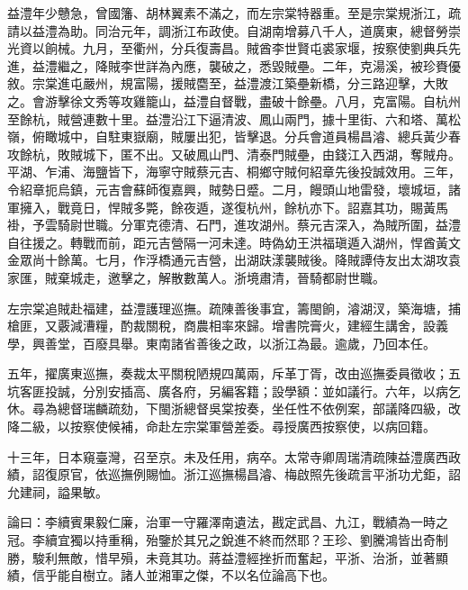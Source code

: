 \begin{pinyinscope}
益澧年少戇急，曾國籓、胡林翼素不滿之，而左宗棠特器重。至是宗棠規浙江，疏請以益澧為助。同治元年，調浙江布政使。自湖南增募八千人，道廣東，總督勞崇光資以餉械。九月，至衢州，分兵復壽昌。賊酋李世賢屯裘家堰，按察使劉典兵先進，益澧繼之，降賊李世詳為內應，襲破之，悉毀賊壘。二年，克湯溪，被珍賚優敘。宗棠進屯嚴州，規富陽，援賊麕至，益澧渡江築壘新橋，分三路迎擊，大敗之。會游擊徐文秀等攻雞籠山，益澧自督戰，盡破十餘壘。八月，克富陽。自杭州至餘杭，賊營連數十里。益澧沿江下逼清波、鳳山兩門，據十里街、六和塔、萬松嶺，俯瞰城中，自駐東嶽廟，賊屢出犯，皆擊退。分兵會道員楊昌濬、總兵黃少春攻餘杭，敗賊城下，匿不出。又破鳳山門、清泰門賊壘，由錢江入西湖，奪賊舟。平湖、乍浦、海鹽皆下，海寧守賊蔡元吉、桐鄉守賊何紹章先後投誠效用。三年，令紹章扼烏鎮，元吉會蘇師復嘉興，賊勢日蹙。二月，饅頭山地雷發，壞城垣，諸軍擁入，戰竟日，悍賊多斃，餘夜遁，遂復杭州，餘杭亦下。詔嘉其功，賜黃馬褂，予雲騎尉世職。分軍克德清、石門，進攻湖州。蔡元吉深入，為賊所圍，益澧自往援之。轉戰而前，距元吉營隔一河未達。時偽幼王洪福瑱遁入湖州，悍酋黃文金眾尚十餘萬。七月，作浮橋通元吉營，出湖趺漾襲賊後。降賊譚侍友出太湖攻袁家匯，賊棄城走，邀擊之，解散數萬人。浙境肅清，晉騎都尉世職。

左宗棠追賊赴福建，益澧護理巡撫。疏陳善後事宜，籌閩餉，濬湖汊，築海塘，捕槍匪，又覈減漕糧，酌裁關稅，商農相率來歸。增書院膏火，建經生講舍，設義學，興善堂，百廢具舉。東南諸省善後之政，以浙江為最。逾歲，乃回本任。

五年，擢廣東巡撫，奏裁太平關稅陋規四萬兩，斥革丁胥，改由巡撫委員徵收；五坑客匪投誠，分別安插高、廣各府，另編客籍；設學額：並如議行。六年，以病乞休。尋為總督瑞麟疏劾，下閩浙總督吳棠按奏，坐任性不依例案，部議降四級，改降二級，以按察使候補，命赴左宗棠軍營差委。尋授廣西按察使，以病回籍。

十三年，日本窺臺灣，召至京。未及任用，病卒。太常寺卿周瑞清疏陳益澧廣西政績，詔復原官，依巡撫例賜恤。浙江巡撫楊昌濬、梅啟照先後疏言平浙功尤鉅，詔允建祠，謚果敏。

論曰：李續賓果毅仁廉，治軍一守羅澤南遺法，戡定武昌、九江，戰績為一時之冠。李續宜獨以持重稱，殆鑒於其兄之銳進不終而然耶？王珍、劉騰鴻皆出奇制勝，駿利無敵，惜早殞，未竟其功。蔣益澧經挫折而奮起，平浙、治浙，並著顯績，信乎能自樹立。諸人並湘軍之傑，不以名位論高下也。


\end{pinyinscope}